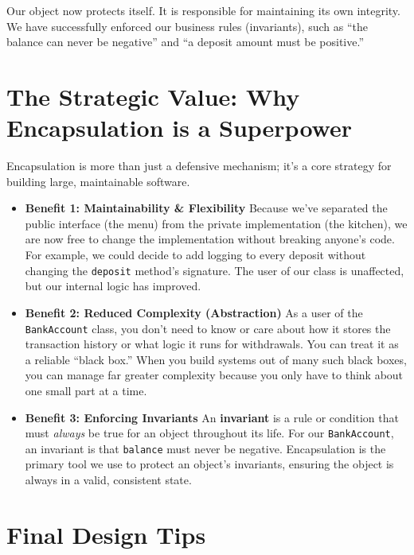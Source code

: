 \documentclass[
  letterpaper,
  DIV=11,
  numbers=noendperiod]{scrreprt}
\begin{document}
Our object now protects itself. It is responsible for maintaining its
own integrity. We have successfully enforced our business rules
(invariants), such as ``the balance can never be negative'' and ``a
deposit amount must be positive.''

\section{The Strategic Value: Why Encapsulation is a
Superpower}\label{the-strategic-value-why-encapsulation-is-a-superpower}

Encapsulation is more than just a defensive mechanism; it's a core
strategy for building large, maintainable software.

\begin{itemize}
\item
  \textbf{Benefit 1: Maintainability \& Flexibility} Because we've
  separated the public interface (the menu) from the private
  implementation (the kitchen), we are now free to change the
  implementation without breaking anyone's code. For example, we could
  decide to add logging to every deposit without changing the
  \texttt{deposit} method's signature. The user of our class is
  unaffected, but our internal logic has improved.
\item
  \textbf{Benefit 2: Reduced Complexity (Abstraction)} As a user of the
  \texttt{BankAccount} class, you don't need to know or care about how
  it stores the transaction history or what logic it runs for
  withdrawals. You can treat it as a reliable ``black box.'' When you
  build systems out of many such black boxes, you can manage far greater
  complexity because you only have to think about one small part at a
  time.
\item
  \textbf{Benefit 3: Enforcing Invariants} An \textbf{invariant} is a
  rule or condition that must \emph{always} be true for an object
  throughout its life. For our \texttt{BankAccount}, an invariant is
  that \texttt{balance} must never be negative. Encapsulation is the
  primary tool we use to protect an object's invariants, ensuring the
  object is always in a valid, consistent state.
\end{itemize}

\section{Final Design Tips}\label{final-design-tips}
\end{document}
